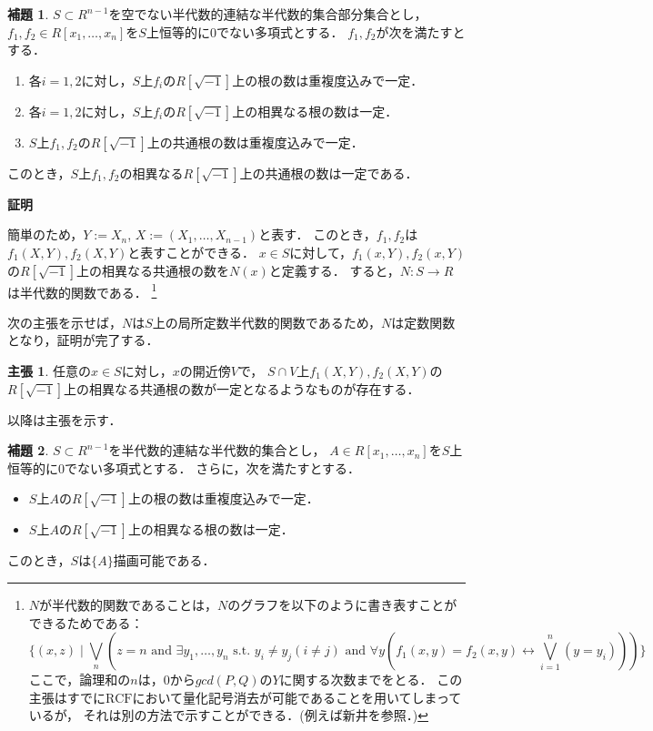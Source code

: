\documentclass[uplatex, dvipdfmx]{jsarticle}
\makeatletter
\renewenvironment{proof}[1][\proofname]{\par
  \pushQED{\qed}%
  \normalfont \topsep6\p@\@plus6\p@\relax
  \trivlist
  \item\relax
  {\bfseries
  #1\@addpunct{.}}\hspace\labelsep\ignorespaces
}{%
  \popQED\endtrivlist\@endpefalse
}
\newcommand{\RCF}{\mathrm{RCF}}
\newcommand{\map}[3]{{#1}:{#2}\rightarrow{#3}}
\theoremstyle{definition}
\newtheorem{lemma}{補題}[section]
\newtheorem*{claim*}{主張}
\renewcommand{\proofname}{\textbf{証明}}
\makeatother
\begin{document}
\begin{lemma}\label{lemma:del_1}
     $S \subset R^{n-1}$を空でない半代数的連結な半代数的集合部分集合とし，
     $f_1, f_2 \in R[x_1, \dots, x_n]$を$S$上恒等的に$0$でない多項式とする．
     $f_1, f_2$が次を満たすとする．
     \begin{enumerate}
          \item 各$i=1, 2$に対し，$S$上$f_i$の$R[\sqrt{-1}]$上の根の数は重複度込みで一定．
          \item 各$i=1, 2$に対し，$S$上$f_i$の$R[\sqrt{-1}]$上の相異なる根の数は一定．
          \item $S$上$f_1, f_2$の$R[\sqrt{-1}]$上の共通根の数は重複度込みで一定．
     \end{enumerate}
     このとき，$S$上$f_1, f_2$の相異なる$R[\sqrt{-1}]$上の共通根の数は一定である．
\end{lemma}
\begin{proof}
     簡単のため，$Y:=X_n$, $X:=(X_1, \dots, X_{n-1})$と表す．
     このとき，$f_1, f_2$は$f_1(X,Y), f_2(X,Y)$と表すことができる．
     $x \in S$に対して，$f_1(x,Y), f_2(x,Y)$の$R[\sqrt{-1}]$上の相異なる共通根の数を$N(x)$と定義する．
     すると，$\map{N}{S}{R}$は半代数的関数である．
     \footnote{$N$が半代数的関数であることは，$N$のグラフを以下のように書き表すことができるためである：
     \[
          \{(x,z) \mid \bigvee_{n}(z = n \text{ and } \exists y_1, \dots, y_n \text{ s.t. } y_i \neq y_j( i\neq j) \text{ and } \forall y(f_1(x,y)=f_2(x,y) \leftrightarrow \bigvee_{i=1}^n (y = y_i)))\}
     \]
     ここで，論理和の$n$は，$0$から$gcd(P,Q)$の$Y$に関する次数までをとる．
     この主張はすでに$\RCF$において$量化記号消去$が可能であることを用いてしまっているが，
     それは別の方法で示すことができる．(例えば新井\cite{Arai}を参照．)
     }

     次の主張を示せば，$N$は$S$上の局所定数半代数的関数であるため，$N$は定数関数となり，証明が完了する．
     \begin{claim*}
          任意の$x \in S$に対し，$x$の開近傍$V$で，
          $S\cap V$上$f_1(X,Y), f_2(X,Y)$の$R[\sqrt{-1}]$上の相異なる共通根の数が一定となるようなものが存在する．
     \end{claim*}
     以降は主張を示す．
\end{proof}

\begin{lemma}\label{lemma:del_2}
     $S \subset R^{n-1}$を半代数的連結な半代数的集合とし，     
     $A \in R[x_1, \dots, x_n]$を$S$上恒等的に$0$でない多項式とする．
     さらに，次を満たすとする．
     \begin{itemize}
          \item $S$上$A$の$R[\sqrt{-1}]$上の根の数は重複度込みで一定．
          \item $S$上$A$の$R[\sqrt{-1}]$上の相異なる根の数は一定．
     \end{itemize}
     このとき，$S$は$\{A\}$描画可能である．
\end{lemma}
\end{document}
